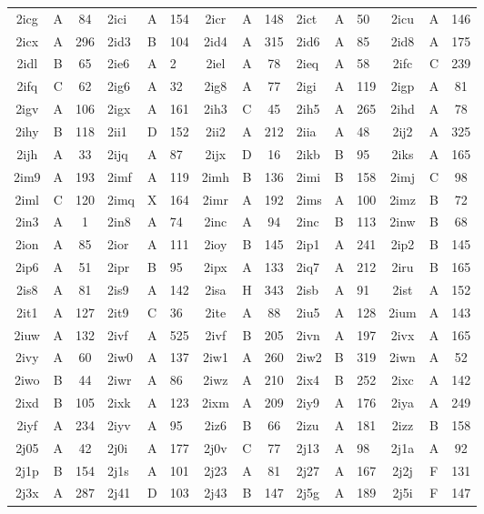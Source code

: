 \begin{longtable}{|c|c|c| a|a|a| c|c|c| a|a|a| c|c|c|}
2icg & A & 84 & 2ici & A & 154 & 2icr & A & 148 & 2ict & A & 50 & 2icu & A & 146\\
2icx & A & 296 & 2id3 & B & 104 & 2id4 & A & 315 & 2id6 & A & 85 & 2id8 & A & 175\\
2idl & B & 65 & 2ie6 & A & 2 & 2iel & A & 78 & 2ieq & A & 58 & 2ifc & C & 239\\
2ifq & C & 62 & 2ig6 & A & 32 & 2ig8 & A & 77 & 2igi & A & 119 & 2igp & A & 81\\
2igv & A & 106 & 2igx & A & 161 & 2ih3 & C & 45 & 2ih5 & A & 265 & 2ihd & A & 78\\
2ihy & B & 118 & 2ii1 & D & 152 & 2ii2 & A & 212 & 2iia & A & 48 & 2ij2 & A & 325\\
2ijh & A & 33 & 2ijq & A & 87 & 2ijx & D & 16 & 2ikb & B & 95 & 2iks & A & 165\\
2im9 & A & 193 & 2imf & A & 119 & 2imh & B & 136 & 2imi & B & 158 & 2imj & C & 98\\
2iml & C & 120 & 2imq & X & 164 & 2imr & A & 192 & 2ims & A & 100 & 2imz & B & 72\\
2in3 & A & 1 & 2in8 & A & 74 & 2inc & A & 94 & 2inc & B & 113 & 2inw & B & 68\\
2ion & A & 85 & 2ior & A & 111 & 2ioy & B & 145 & 2ip1 & A & 241 & 2ip2 & B & 145\\
2ip6 & A & 51 & 2ipr & B & 95 & 2ipx & A & 133 & 2iq7 & A & 212 & 2iru & B & 165\\
2is8 & A & 81 & 2is9 & A & 142 & 2isa & H & 343 & 2isb & A & 91 & 2ist & A & 152\\
2it1 & A & 127 & 2it9 & C & 36 & 2ite & A & 88 & 2iu5 & A & 128 & 2ium & A & 143\\
2iuw & A & 132 & 2ivf & A & 525 & 2ivf & B & 205 & 2ivn & A & 197 & 2ivx & A & 165\\
2ivy & A & 60 & 2iw0 & A & 137 & 2iw1 & A & 260 & 2iw2 & B & 319 & 2iwn & A & 52\\
2iwo & B & 44 & 2iwr & A & 86 & 2iwz & A & 210 & 2ix4 & B & 252 & 2ixc & A & 142\\
2ixd & B & 105 & 2ixk & A & 123 & 2ixm & A & 209 & 2iy9 & A & 176 & 2iya & A & 249\\
2iyf & A & 234 & 2iyv & A & 95 & 2iz6 & B & 66 & 2izu & A & 181 & 2izz & B & 158\\
2j05 & A & 42 & 2j0i & A & 177 & 2j0v & C & 77 & 2j13 & A & 98 & 2j1a & A & 92\\
2j1p & B & 154 & 2j1s & A & 101 & 2j23 & A & 81 & 2j27 & A & 167 & 2j2j & F & 131\\
2j3x & A & 287 & 2j41 & D & 103 & 2j43 & B & 147 & 2j5g & A & 189 & 2j5i & F & 147\\

\end{longtable}
